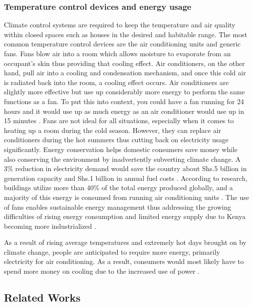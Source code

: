 \subsubsection{Temperature control devices and energy usage}

Climate control systems are required to keep the temperature and air quality within closed spaces such as houses in the desired and habitable range. The most common temperature control devices are the air conditioning units and generic fans. Fans blow air into a room which allows moisture to evaporate from an occupant’s skin thus providing that cooling effect. Air conditioners, on the other hand, pull air into a cooling and condensation mechanism, and once this cold air is radiated back into the room, a cooling effect occurs. Air conditioners are slightly more effective but use up considerably more energy to perform the same functions as a fan. To put this into context, you could have a fan running for 24 hours and it would use up as much energy as an air conditioner would use up in 15 minutes \cite{brezinski_air_nodate}. Fans are not ideal for all situations, especially when it comes to heating up a room during the cold season. However, they can replace air conditioners during the hot summers thus cutting back on electricity usage significantly. Energy conservation helps domestic consumers save money while also conserving the environment by inadvertently subverting climate change. A 3\% reduction in electricity demand would save the country about Shs.5 billion in generation capacity and Shs.1 billion in annual fuel costs \cite{noauthor_home_nodate}. According to research, buildings utilize more than 40\% of the total energy produced globally, and a majority of this energy is consumed from running air conditioning units \cite{allouhi_energy_2015}. The use of fans enables sustainable energy management thus addressing the growing difficulties of rising energy consumption and limited energy supply due to Kenya becoming more industrialized \cite{noauthor_pdf_nodate}. 
\par
As a result of rising average temperatures and extremely hot days brought on by climate change, people are anticipated to require more energy, primarily electricity for air conditioning. As a result, consumers would most likely have to spend more money on cooling due to the increased use of power \cite{reidmiller_report--brief_2018}. 


\subsection{Related Works}

